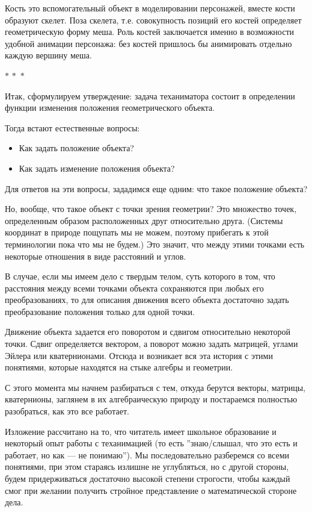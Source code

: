 \documentclass[a4paper,12pt]{article}
\newcommand{\threestars}{\begin{center}$ {\ast}\,{\ast}\,{\ast} $\end{center}}
\newcounter{z-counter}
\newcounter{th-counter}
\begin{document}
Кость это вспомогательный объект в моделировании персонажей, вместе кости образуют скелет. Поза скелета, т.е. совокупность позиций его костей определяет геометрическую форму меша. Роль костей заключается именно в возможности удобной анимации персонажа: без костей пришлось бы анимировать отдельно каждую вершину меша.

\threestars

Итак, сформулируем утверждение: задача теханиматора состоит в определении функции изменения положения геометрического объекта. 

Тогда встают естественные вопросы:
\begin{itemize}
    \item Как задать положение объекта?
    \item Как задать изменение положения объекта?
\end{itemize}
Для ответов на эти вопросы, зададимся еще одним: что такое положение объекта?

Но, вообще, что такое объект с точки зрения геометрии? Это множество точек, определенным образом расположенных друг относительно друга. (Системы координат в природе пощупать мы не можем, поэтому прибегать к этой терминологии пока что мы не будем.) Это значит, что между этими точками есть некоторые отношения в виде расстояний и углов.

В случае, если мы имеем дело с твердым телом, суть которого в том, что расстояния между всеми точками объекта сохраняются при любых его преобразованиях, то для описания движения всего объекта достаточно задать преобразование положения только для одной точки.

Движение объекта задается его поворотом и сдвигом относительно некоторой точки. Сдвиг определяется вектором, а поворот можно задать матрицей, углами Эйлера или кватернионами. Отсюда и возникает вся эта история с этими понятиями, которые находятся на стыке алгебры и геометрии.

С этого момента мы начнем разбираться с тем, откуда берутся векторы, матрицы, кватернионы, заглянем в их алгебраическую природу и постараемся полностью разобраться, как это все работает.

Изложение рассчитано на то, что читатель имеет школьное образование и некоторый опыт работы с теханимацией (то есть ''знаю/слышал, что это есть и работает, но как --- не понимаю''). Мы последовательно разберемся со всеми понятиями, при этом стараясь излишне не углубляться, но с другой стороны, будем придерживаться достаточно высокой степени строгости, чтобы каждый смог при желании получить стройное представление о математической стороне дела.
\end{document}
